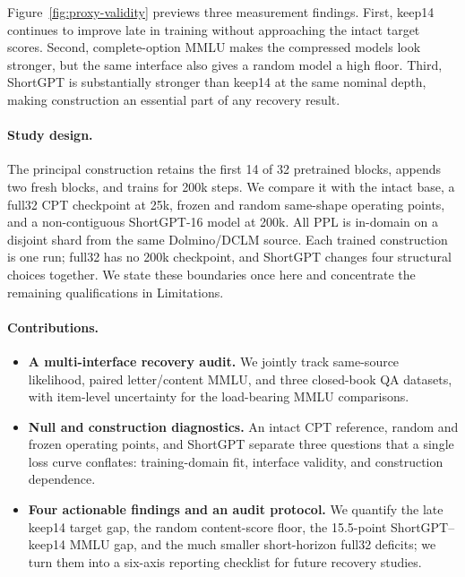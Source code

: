 Figure~\ref{fig:proxy-validity} previews three measurement findings. First,
keep14 continues to improve late in training without approaching the intact
target scores. Second, complete-option MMLU makes the compressed models look
stronger, but the same interface also gives a random model a high floor. Third,
ShortGPT is substantially stronger than keep14 at the same nominal depth,
making construction an essential part of any recovery result.

\paragraph{Study design.}
The principal construction retains the first 14 of 32 pretrained blocks,
appends two fresh blocks, and trains for 200k steps. We compare it with the
intact base, a full32 CPT checkpoint at 25k, frozen and random same-shape
operating points, and a non-contiguous ShortGPT-16 model at 200k. All PPL is
in-domain on a disjoint shard from the same Dolmino/DCLM source. Each trained
construction is one run; full32 has no 200k checkpoint, and ShortGPT changes
four structural choices together. We state these boundaries once here and
concentrate the remaining qualifications in Limitations.

\paragraph{Contributions.}
\begin{itemize}[leftmargin=1.2em,itemsep=2pt]
\item \textbf{A multi-interface recovery audit.} We jointly track same-source
likelihood, paired letter/content MMLU, and three closed-book QA datasets, with
item-level uncertainty for the load-bearing MMLU comparisons.
\item \textbf{Null and construction diagnostics.} An intact CPT reference,
random and frozen operating points, and ShortGPT separate three questions that
a single loss curve conflates: training-domain fit, interface validity, and
construction dependence.
\item \textbf{Four actionable findings and an audit protocol.} We quantify the
late keep14 target gap, the random content-score floor, the 15.5-point
ShortGPT--keep14 MMLU gap, and the much smaller short-horizon full32 deficits;
we turn them into a six-axis reporting checklist for future recovery studies.
\end{itemize}

